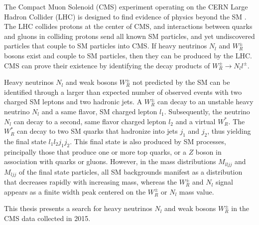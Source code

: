 The Compact Muon Solenoid (CMS) experiment operating on the CERN Large Hadron Collider (LHC) is designed to 
find evidence of physics beyond the SM \cite{cmsTDR}.  The LHC collides protons at the center of CMS, and interactions 
between quarks and gluons in colliding protons send all known SM particles, and yet undiscovered particles 
that couple to SM particles into CMS.  If heavy neutrinos $N_{l}$ and $W^{\pm}_{R}$ bosons exist and couple to SM particles, 
then they can be produced by the LHC.  CMS can prove their existence by identifying the decay products of 
$W^{\pm}_{R} \rightarrow N_{l} l^{\pm}$.

Heavy neutrinos $N_{l}$ and weak bosons $W^{\pm}_{R}$ not predicted by the SM can be identified through a larger 
than expected number of observed events with two charged SM leptons and two hadronic jets.  A $W^{\pm}_{R}$ can 
decay to an unstable heavy neutrino $N_{l}$ and a same flavor, SM charged lepton $l_{1}$.  Subsequently, the 
neutrino $N_{l}$ can decay to a second, same flavor charged lepton $l_{2}$ and a virtual $W^{*}_{R}$.  The $W^{*}_{R}$ can 
decay to two SM quarks that hadronize into jets $j_{1}$ and $j_{2}$, thus yielding the final state $l_{1}l_{2}j_{1}j_{2}$.  
This final state is also produced by SM processes, principally those that produce one or more top quarks, or 
a $Z$ boson in association with quarks or gluons.  However, in the mass distributions $M_{lljj}$ and $M_{ljj}$ 
of the final state particles, all SM backgrounds manifest as a distribution that decreases rapidly with increasing 
mass, whereas the $W^{\pm}_{R}$ and $N_{l}$ signal appears as a finite width peak centered on the $W^{\pm}_{R}$ 
or $N_{l}$ mass value.

This thesis presents a search for heavy neutrinos $N_{l}$ and weak bosons $W^{\pm}_{R}$ in the CMS data collected 
in 2015.

